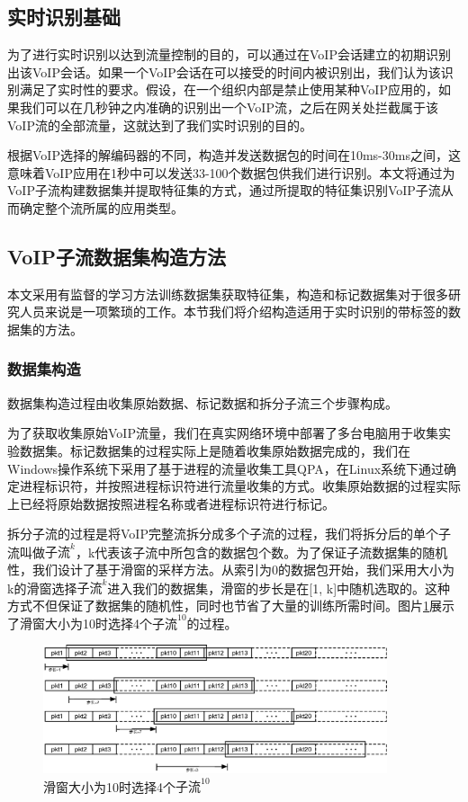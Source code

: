 \subsection{实时识别基础}
为了进行实时识别以达到流量控制的目的，可以通过在VoIP会话建立的初期识别出该VoIP会话。如果一个VoIP会话在可以接受的时间内被识别出，我们认为该识别满足了实时性的要求。假设，在一个组织内部是禁止使用某种VoIP应用的，如果我们可以在几秒钟之内准确的识别出一个VoIP流，之后在网关处拦截属于该VoIP流的全部流量，这就达到了我们实时识别的目的。

根据VoIP选择的解编码器的不同，构造并发送数据包的时间在10ms-30ms之间，这意味着VoIP应用在1秒中可以发送33-100个数据包供我们进行识别。本文将通过为VoIP子流构建数据集并提取特征集的方式，通过所提取的特征集识别VoIP子流从而确定整个流所属的应用类型。

\subsection{VoIP子流数据集构造方法}
本文采用有监督的学习方法训练数据集获取特征集，构造和标记数据集对于很多研究人员来说是一项繁琐的工作。本节我们将介绍构造适用于实时识别的带标签的数据集的方法。
\subsubsection{数据集构造}
\label{sec:construct}
数据集构造过程由收集原始数据、标记数据和拆分子流三个步骤构成。

为了获取收集原始VoIP流量，我们在真实网络环境中部署了多台电脑用于收集实验数据集。标记数据集的过程实际上是随着收集原始数据完成的，我们在Windows操作系统下采用了基于进程的流量收集工具QPA，在Linux系统下通过确定进程标识符，并按照进程标识符进行流量收集的方式。收集原始数据的过程实际上已经将原始数据按照进程名称或者进程标识符进行标记。

拆分子流的过程是将VoIP完整流拆分成多个子流的过程，我们将拆分后的单个子流叫做$\text{子流}^k$，k代表该子流中所包含的数据包个数。为了保证子流数据集的随机性，我们设计了基于滑窗的采样方法。从索引为0的数据包开始，我们采用大小为k的滑窗选择$\text{子流}^k$进入我们的数据集，滑窗的步长是在[1, k]中随机选取的。这种方式不但保证了数据集的随机性，同时也节省了大量的训练所需时间。图片\ref{fig:dataset}展示了滑窗大小为10时选择4个$\text{子流}^{10}$的过程。
\begin{figure}[thb]
\begin{center}
\includegraphics[width=0.9\textwidth]{figures/dataset.eps}
\caption{滑窗大小为10时选择4个$\text{子流}^{10}$}\label{fig:dataset}
\end{center}
\end{figure}

